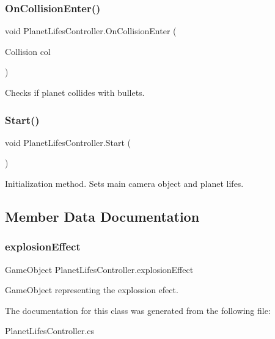 \subsubsection{\texorpdfstring{On\+Collision\+Enter()}{OnCollisionEnter()}}
{\footnotesize\ttfamily void Planet\+Lifes\+Controller.\+On\+Collision\+Enter (\begin{DoxyParamCaption}\item[{Collision}]{col }\end{DoxyParamCaption})}



Checks if planet collides with bullets. 

\mbox{\label{class_planet_lifes_controller_acb812ee09ae6ed65b85baf971a582b25}} 
\subsubsection{\texorpdfstring{Start()}{Start()}}
{\footnotesize\ttfamily void Planet\+Lifes\+Controller.\+Start (\begin{DoxyParamCaption}{ }\end{DoxyParamCaption})}



Initialization method. Sets main camera object and planet lifes. 



\subsection{Member Data Documentation}
\mbox{\label{class_planet_lifes_controller_a793b98df14aca219bbdeec8fa0a21688}} 
\subsubsection{\texorpdfstring{explosion\+Effect}{explosionEffect}}
{\footnotesize\ttfamily Game\+Object Planet\+Lifes\+Controller.\+explosion\+Effect}



Game\+Object representing the explossion efect. 



The documentation for this class was generated from the following file\+:\begin{DoxyCompactItemize}
\item 
Planet\+Lifes\+Controller.\+cs\end{DoxyCompactItemize}
